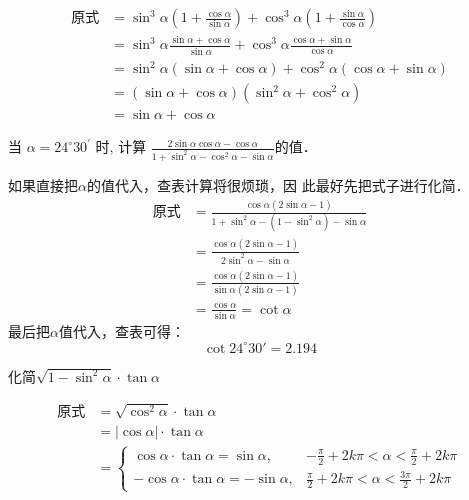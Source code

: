 \begin{solution}
\[\begin{split}
\text{原式}
    &=\sin ^{3} \alpha\left(1+\frac{\cos \alpha}{\sin \alpha}\right)+\cos ^{3} \alpha\left(1+\frac{\sin \alpha}{\cos \alpha}\right) \\
    &=\sin ^{3} \alpha \frac{\sin \alpha+\cos \alpha}{\sin \alpha}+\cos ^{3} \alpha \frac{\cos \alpha+\sin \alpha}{\cos \alpha} \\
    &=\sin ^{2} \alpha(\sin \alpha+\cos \alpha)+\cos ^{2} \alpha(\cos \alpha+\sin \alpha) \\
    &=(\sin \alpha+\cos \alpha)\left(\sin ^{2} \alpha+\cos ^{2} \alpha\right) \\
    &=\sin \alpha+\cos \alpha
\end{split}\]
\end{solution}

\begin{example}
    当 $\alpha=24^{\circ} 30^{\prime}$ 时, 计算
$
\frac{2 \sin \alpha \cos \alpha-\cos \alpha}{1+\sin ^{2} \alpha-\cos ^{2} \alpha-\sin \alpha}
$的值．
\end{example}

\begin{solution}
    如果直接把$\alpha$的值代入，查表计算将很烦琐，因
此最好先把式子进行化简．
\[\begin{split}
\text{原式}&=\frac{\cos\alpha(2\sin\alpha-1)}{1+\sin^2\alpha-(1-\sin^2\alpha)-\sin\alpha}\\
&=\frac{\cos\alpha(2\sin\alpha-1)}{2\sin^2\alpha-\sin\alpha}\\
&=\frac{\cos\alpha(2\sin\alpha-1)}{\sin\alpha(2\sin\alpha-1)}\\
&=\frac{\cos\alpha}{\sin\alpha}=\cot\alpha
\end{split}\]
最后把$\alpha$值代入，查表可得：
\[\cot24^{\circ}30'=2.194\]
\end{solution}


\begin{example}
    化简$\sqrt{1-\sin^2\alpha}\cdot \tan\alpha$
\end{example}

\begin{solution}
\[\begin{split}
    \text{原式}&=\sqrt{\cos^2\alpha}\cdot \tan\alpha\\
    &=|\cos\alpha|\cdot \tan\alpha\\
    &=\begin{cases}
   \cos\alpha\cdot \tan\alpha=\sin\alpha, & -\frac{\pi}{2}+2k\pi<\alpha<\frac{\pi}{2}+2k\pi\\
   -\cos\alpha\cdot \tan\alpha=-\sin\alpha, & \frac{\pi}{2}+2k\pi<\alpha<\frac{3\pi}{2}+2k\pi
    \end{cases}
\end{split}\]
\end{solution}

